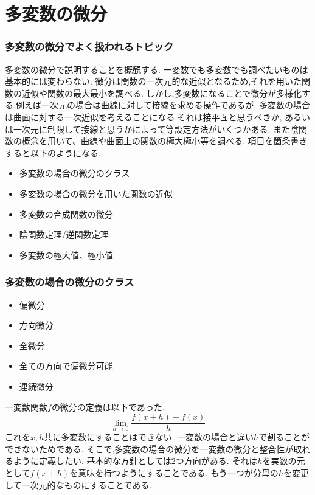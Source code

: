 \part{多変数の微分}
\section{多変数の微分でよく扱われるトピック}
多変数の微分で説明することを概観する.
一変数でも多変数でも調べたいものは基本的には変わらない.
微分は関数の一次元的な近似となるため,それを用いた関数の近似や関数の最大最小を調べる.
しかし,多変数になることで微分が多様化する.例えば一次元の場合は曲線に対して接線を求める操作であるが,
多変数の場合は曲面に対する一次近似を考えることになる.それは接平面と思うべきか,
あるいは一次元に制限して接線と思うかによって等設定方法がいくつかある.
また陰関数の概念を用いて、曲線や曲面上の関数の極大極小等を調べる.
項目を箇条書きすると以下のようになる.

\begin{itemize}
  \item  多変数の場合の微分のクラス
  \item  多変数の場合の微分を用いた関数の近似
  \item  多変数の合成関数の微分
  \item  陰関数定理/逆関数定理
  \item  多変数の極大値、極小値
\end{itemize}

\section{多変数の場合の微分のクラス}
\begin{itemize}
\item 偏微分
\item 方向微分
\item 全微分
\item 全ての方向で偏微分可能
\item 連続微分
\end{itemize}

一変数関数$f$の微分の定義は以下であった.
\begin{equation*}
\lim_{h \to 0} \frac{f(x+h) - f(x)}{h}
\end{equation*}
これを$x, h$共に多変数にすることはできない.
一変数の場合と違い$h$で割ることができないためである.
そこで,多変数の場合の微分を一変数の微分と整合性が取れるように定義したい.
基本的な方針としては2つ方向がある.
それは$h$を実数の元として$f(x+h)$を意味を持つようにすることである.
もう一つが分母の$h$を変更して一次元的なものにすることである.

